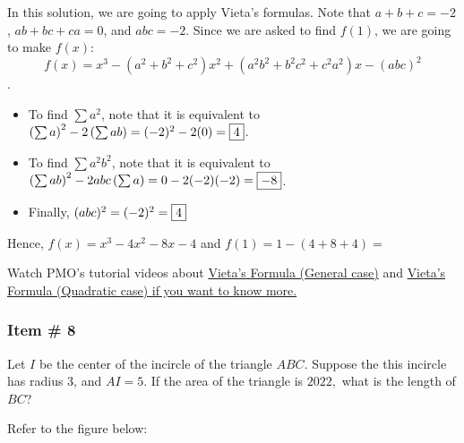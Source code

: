 \documentclass[11pt,paper=letter]{scrartcl}
\begin{document}

\sol

In this solution, we are going to apply Vieta's formulas. Note that $a+b+c = -2$, $ab+bc+ca = 0$, and $abc = -2$. Since we are asked to find $f(1)$, we are going to make $f(x)$: $$f(x) = x^3 - (a^2 + b^2 + c^2)x^2 + (a^2b^2+b^2c^2+c^2a^2)x - (abc)^2$$. 

\begin{itemize}
    \item To find $\sum a^2$, note that it is equivalent to $\left(\sum a\right)^2 -2\left(\sum ab\right) = (-2)^2 - 2(0) = \fbox{4}$. 
    
    \item To find $\sum a^2b^2$, note that it is equivalent to $\left(\sum ab\right)^2 -2abc\left(\sum a\right)= 0 -2(-2)(-2) = \fbox{$-8$}$. 
    
    \item Finally, $(abc)^2 = (-2)^2 = \fbox{4}$
\end{itemize}

Hence, $f(x) = x^3 -4x^2 -8x - 4$ and $f(1) = 1 - (4+8+4) = $ 

\begin{mdframed}
\begin{rem}
Watch PMO's tutorial videos about \href{https://www.youtube.com/watch?v=yT1-mWubPxs}{Vieta's Formula (General case)} and \href{https://www.youtube.com/watch?v=M53VPK1ZnuI&t=267s}{Vieta's Formula (Quadratic case) if you want to know more.}
\end{rem}

\end{mdframed}


\subsubsection{Item \# 8}

\begin{probboxed}
Let $I$ be the center of the incircle of the triangle $ABC.$ Suppose the this incircle has radius 3, and $AI =5.$ If the area of the triangle is $2022,$ what is the length of $BC$?
   
\end{probboxed}


\sol

Refer to the figure below:
\end{document}
